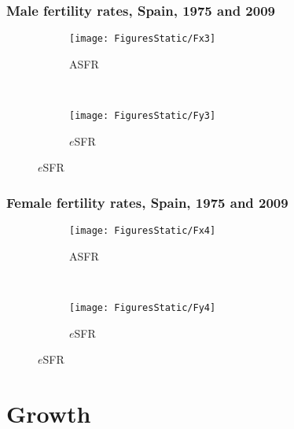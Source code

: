 \documentclass{beamer}
\begin{document}
\begin{frame}
\frametitle{Male fertility rates, Spain, 1975 and 2009}
\vspace{-5em}
\begin{figure}
        \centering
        \begin{subfigure}[b]{0.5\textwidth}
                \centering
                \caption*{ASFR}
                \texttt{[image: FiguresStatic/Fx3]}
        \end{subfigure}%
        ~ %
        \begin{subfigure}[b]{0.5\textwidth}
                \centering
                \caption*{$e$SFR}
                \texttt{[image: FiguresStatic/Fy3]}
        \end{subfigure}
\end{figure}
\end{frame}
\begin{frame}
\frametitle{Female fertility rates, Spain, 1975 and 2009}
\vspace{-5em}
\begin{figure}
        \centering
        \begin{subfigure}[b]{0.5\textwidth}
                \centering
                \caption*{ASFR}
                \texttt{[image: FiguresStatic/Fx4]}
        \end{subfigure}%
        ~ %
        \begin{subfigure}[b]{0.5\textwidth}
                \centering
                \caption*{$e$SFR}
                \texttt{[image: FiguresStatic/Fy4]}
        \end{subfigure}
\end{figure}
\end{frame}
\section{Growth}
\end{document}
